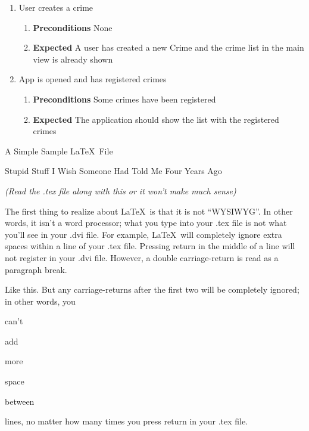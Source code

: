 \documentclass{article}
\begin{document}
\begin{enumerate}
  \item User creates a crime
  \begin{enumerate}
   \item \textbf{Preconditions} None
   \item \textbf{Expected} A user has created a new Crime and the crime list in the main view is already shown
  \end{enumerate}

  \item App is opened and has registered crimes
  \begin{enumerate}
   \item \textbf{Preconditions} Some crimes have been registered
   \item \textbf{Expected} The application should show the list with the registered crimes
  \end{enumerate}

\end{enumerate}



\centerline{\sc \large A Simple Sample \LaTeX\ File}
\vspace{.5pc}
\centerline{\sc Stupid Stuff I Wish Someone Had Told Me Four Years Ago}
\centerline{\it (Read the .tex file along with this or it won't 
  make much sense)}
\vspace{2pc}

The first thing to realize about \LaTeX\ is that it is not ``WYSIWYG''. 
In other words, it isn't a word processor; what you type into your 
.tex file is not what you'll see in your .dvi file.  For example, 
\LaTeX\ will      completely     ignore               extra
spaces    within                             a line of your .tex file.
Pressing return
in 
the 
middle 
of
a
line
will not register in your .dvi file. However, a double carriage-return
is read as a paragraph break.

Like this.  But any carriage-returns after the first two will be 
completely ignored; in other words, you 


can't 

add






more 




space 


between 




lines, no matter how many times you press return in your .tex file.
\end{document}
